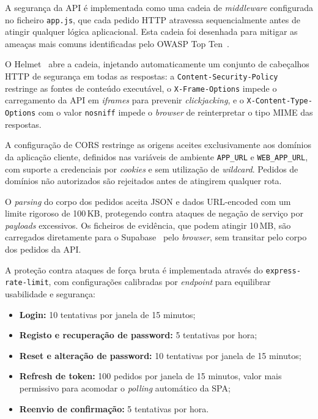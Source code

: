 \documentclass[12pt,a4paper]{report}
\begin{document}
A segurança da API é implementada como uma cadeia de \textit{middleware} configurada no ficheiro \texttt{app.js}, que cada pedido HTTP atravessa sequencialmente antes de atingir qualquer lógica aplicacional. Esta cadeia foi desenhada para mitigar as ameaças mais comuns identificadas pelo OWASP Top Ten~\cite{owasp}.

O Helmet~\cite{helmet} abre a cadeia, injetando automaticamente um conjunto de cabeçalhos HTTP de segurança em todas as respostas: a \texttt{Content-Security-Policy} restringe as fontes de conteúdo executável, o \texttt{X-Frame-Options} impede o carregamento da API em \textit{iframes} para prevenir \textit{clickjacking}, e o \texttt{X-Content-Type-Options} com o valor \texttt{nosniff} impede o \textit{browser} de reinterpretar o tipo MIME das respostas.

A configuração de CORS restringe as origens aceites exclusivamente aos domínios da aplicação cliente, definidos nas variáveis de ambiente \texttt{APP\_URL} e \texttt{WEB\_APP\_URL}, com suporte a credenciais por \textit{cookies} e sem utilização de \textit{wildcard}. Pedidos de domínios não autorizados são rejeitados antes de atingirem qualquer rota.

O \textit{parsing} do corpo dos pedidos aceita JSON e dados URL-encoded com um limite rigoroso de 100\,KB, protegendo contra ataques de negação de serviço por \textit{payloads} excessivos. Os ficheiros de evidência, que podem atingir 10\,MB, são carregados diretamente para o Supabase~\cite{supabase} pelo \textit{browser}, sem transitar pelo corpo dos pedidos da API.

A proteção contra ataques de força bruta é implementada através do \texttt{express-rate-limit}, com configurações calibradas por \textit{endpoint} para equilibrar usabilidade e segurança:

\begin{itemize}
  \item \textbf{Login:} 10 tentativas por janela de 15 minutos;
  \item \textbf{Registo e recuperação de password:} 5 tentativas por hora;
  \item \textbf{Reset e alteração de password:} 10 tentativas por janela de 15 minutos;
  \item \textbf{Refresh de token:} 100 pedidos por janela de 15 minutos, valor mais permissivo para acomodar o \textit{polling} automático da SPA;
  \item \textbf{Reenvio de confirmação:} 5 tentativas por hora.
\end{itemize}
\end{document}
